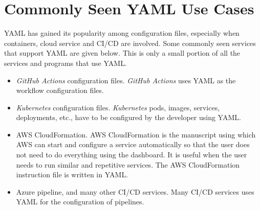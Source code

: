 \section{Commonly Seen YAML Use Cases}

YAML has gained its popularity among configuration files, especially when containers, cloud service and CI/CD are involved. Some commonly seen services that support YAML are given below. This is only a small portion of all the services and programs that use YAML.

\begin{itemize}
	\item \textit{GitHub Actions} configuration files. \textit{GitHub Actions} uses YAML as the workflow configuration files.
	\item \textit{Kubernetes} configuration files. \textit{Kubernetes} pods, images, services, deployments, etc., have to be configured by the developer using YAML.
	\item AWS CloudFormation. AWS CloudFormation is the manuscript using which AWS can start and configure a service automatically so that the user does not need to do everything using the dashboard. It is useful when the user needs to run similar and repetitive services. The AWS CloudFormation instruction file is written in YAML.
	\item Azure pipeline, and many other CI/CD services. Many CI/CD services uses YAML for the configuration of pipelines.
\end{itemize}